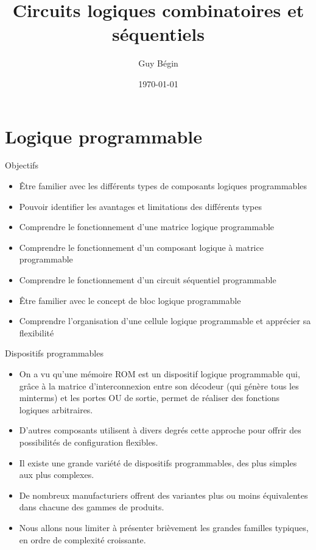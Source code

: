 \documentclass[presentation]{beamer}
\author{Guy Bégin}
\date{\today}
\title{Circuits logiques combinatoires et séquentiels}
\begin{document}
\maketitle

\section{Logique programmable}
\label{sec:orgfbb2c51}
\begin{frame}[label={sec:org2a6c997}]{Objectifs}
\begin{itemize}
\item Être familier avec les différents types de composants logiques programmables
\item Pouvoir identifier les avantages et limitations des différents types
\item Comprendre le fonctionnement d'une matrice logique programmable
\item Comprendre le fonctionnement d'un composant logique à matrice programmable
\item Comprendre le fonctionnement d'un circuit séquentiel programmable
\item Être familier avec le concept de bloc logique programmable
\item Comprendre l'organisation d'une cellule logique programmable et
apprécier sa flexibilité
\end{itemize}
\end{frame}

\begin{frame}[label={sec:orge15a8ba}]{Dispositifs programmables}
\begin{itemize}
\item On a vu qu'une mémoire ROM est un dispositif logique programmable qui, grâce à la matrice d'interconnexion entre son décodeur (qui génère tous les minterms) et les portes OU de sortie, permet de réaliser des fonctions logiques arbitraires.

\item D'autres composants utilisent à divers degrés cette approche pour offrir des possibilités de configuration flexibles.

\item Il existe une grande variété de dispositifs programmables, des plus simples aux plus complexes.

\item De nombreux manufacturiers offrent des variantes plus ou moins équivalentes dans chacune des gammes de produits.

\item Nous allons nous limiter à présenter brièvement les grandes familles typiques, en ordre de complexité croissante.
\end{itemize}
\end{frame}
\end{document}
